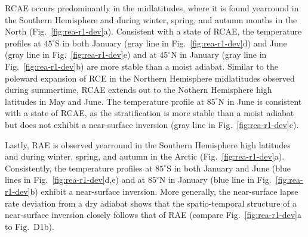 \documentclass{ametsocV5}
\begin{document}
    RCAE occurs predominantly in the midlatitudes, where it is found yearround in the Southern Hemisphere and during winter, spring, and autumn months in the North (Fig.~\ref{fig:rea-r1-dev}a). Consistent with a state of RCAE, the temperature profiles at $45^\circ$S in both January (gray line in Fig.~\ref{fig:rea-r1-dev}d) and June (gray line in Fig.~\ref{fig:rea-r1-dev}e) and at $45^\circ$N in January (gray line in Fig.~\ref{fig:rea-r1-dev}b) are more stable than a moist adiabat. Similar to the poleward expansion of RCE in the Northern Hemisphere midlatitudes observed during summertime, RCAE extends out to the Nothern Hemisphere high latitudes in May and June. The temperature profile at $85^\circ$N in June is consistent with a state of RCAE, as the stratification is more stable than a moist adiabat but does not exhibit a near-surface inversion (gray line in Fig.~\ref{fig:rea-r1-dev}c).

    Lastly, RAE is observed yearround in the Southern Hemisphere high latitudes and during winter, spring, and autumn in the Arctic (Fig.~\ref{fig:rea-r1-dev}a). Consistently, the temperature profiles at $85^\circ$S in both January and June (blue lines in Fig.~\ref{fig:rea-r1-dev}d,e) and at $85^\circ$N in January (blue line in Fig.~\ref{fig:rea-r1-dev}b) exhibit a near-surface inversion. More generally, the near-surface lapse rate deviation from a dry adiabat shows that the spatio-temporal structure of a near-surface inversion closely follows that of RAE (compare Fig.~\ref{fig:rea-r1-dev}a to Fig.~D1b).
     
\end{document}
